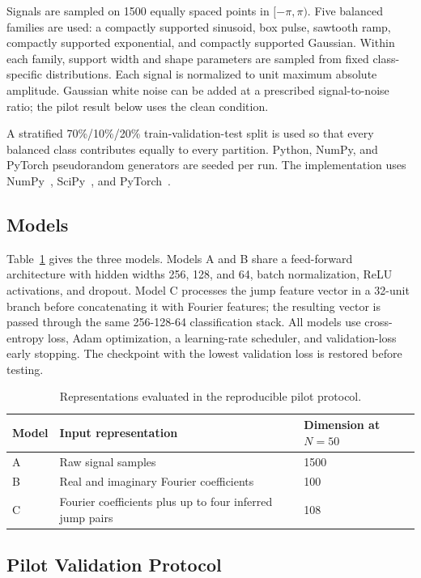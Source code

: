 \documentclass[mathematics,article,submit,moreauthors,pdftex]{mdpi}
\begin{document}
Signals are sampled on 1500 equally spaced points in $[-\pi,\pi)$. Five balanced families are used: a compactly supported sinusoid, box pulse, sawtooth ramp, compactly supported exponential, and compactly supported Gaussian. Within each family, support width and shape parameters are sampled from fixed class-specific distributions. Each signal is normalized to unit maximum absolute amplitude. Gaussian white noise can be added at a prescribed signal-to-noise ratio; the pilot result below uses the clean condition.

A stratified 70\%/10\%/20\% train-validation-test split is used so that every balanced class contributes equally to every partition. Python, NumPy, and PyTorch pseudorandom generators are seeded per run. The implementation uses NumPy~\cite{harris2020numpy}, SciPy~\cite{virtanen2020scipy}, and PyTorch~\cite{paszke2019pytorch}.

\subsection{Models}

Table~\ref{tab:models} gives the three models. Models A and B share a feed-forward architecture with hidden widths 256, 128, and 64, batch normalization, ReLU activations, and dropout. Model C processes the jump feature vector in a 32-unit branch before concatenating it with Fourier features; the resulting vector is passed through the same 256-128-64 classification stack. All models use cross-entropy loss, Adam optimization, a learning-rate scheduler, and validation-loss early stopping. The checkpoint with the lowest validation loss is restored before testing.

\begin{table}[H]
\caption{Representations evaluated in the reproducible pilot protocol.}
\label{tab:models}
\centering
\begin{tabular}{lll}
\toprule
Model & Input representation & Dimension at $N=50$ \\
\midrule
A & Raw signal samples & 1500 \\
B & Real and imaginary Fourier coefficients & 100 \\
C & Fourier coefficients plus up to four inferred jump pairs & 108 \\
\bottomrule
\end{tabular}
\end{table}

\subsection{Pilot Validation Protocol}
\end{document}

